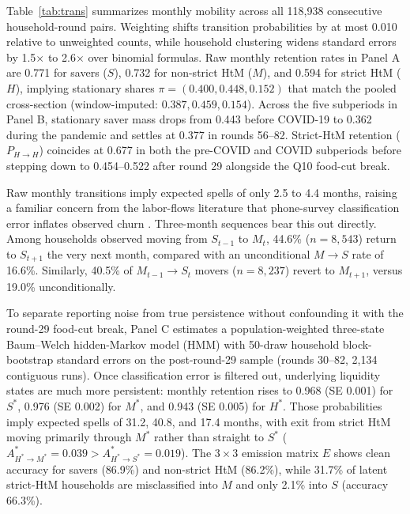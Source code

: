 \documentclass[11pt]{article}
\begin{document}
Table~\ref{tab:trans} summarizes monthly mobility across all 118,938 consecutive household-round pairs. Weighting shifts transition probabilities by at most 0.010 relative to unweighted counts, while household clustering widens standard errors by 1.5$\times$ to 2.6$\times$ over binomial formulas. Raw monthly retention rates in Panel A are 0.771 for savers ($S$), 0.732 for non-strict HtM ($M$), and 0.594 for strict HtM ($H$), implying stationary shares $\pi = (0.400, 0.448, 0.152)$ that match the pooled cross-section (window-imputed: $0.387, 0.459, 0.154$). Across the five subperiods in Panel B, stationary saver mass drops from 0.443 before COVID-19 to 0.362 during the pandemic and settles at 0.377 in rounds 56--82. Strict-HtM retention ($P_{H\to H}$) coincides at 0.677 in both the pre-COVID and COVID subperiods before stepping down to 0.454--0.522 after round 29 alongside the Q10 food-cut break.

Raw monthly transitions imply expected spells of only 2.5 to 4.4 months, raising a familiar concern from the labor-flows literature that phone-survey classification error inflates observed churn \citep{abowd1985effects}. Three-month sequences bear this out directly. Among households observed moving from $S_{t-1}$ to $M_t$, 44.6\% ($n = 8{,}543$) return to $S_{t+1}$ the very next month, compared with an unconditional $M \to S$ rate of 16.6\%. Similarly, 40.5\% of $M_{t-1} \to S_t$ movers ($n = 8{,}237$) revert to $M_{t+1}$, versus 19.0\% unconditionally.

To separate reporting noise from true persistence without confounding it with the round-29 food-cut break, Panel C estimates a population-weighted three-state Baum--Welch hidden-Markov model (HMM) with 50-draw household block-bootstrap standard errors on the post-round-29 sample (rounds 30--82, 2,134 contiguous runs). Once classification error is filtered out, underlying liquidity states are much more persistent: monthly retention rises to 0.968 (SE 0.001) for $S^*$, 0.976 (SE 0.002) for $M^*$, and 0.943 (SE 0.005) for $H^*$. Those probabilities imply expected spells of 31.2, 40.8, and 17.4 months, with exit from strict HtM moving primarily through $M^*$ rather than straight to $S^*$ ($A^*_{H^*\to M^*} = 0.039 > A^*_{H^*\to S^*} = 0.019$). The $3\times 3$ emission matrix $E$ shows clean accuracy for savers (86.9\%) and non-strict HtM (86.2\%), while 31.7\% of latent strict-HtM households are misclassified into $M$ and only 2.1\% into $S$ (accuracy 66.3\%).
\end{document}

